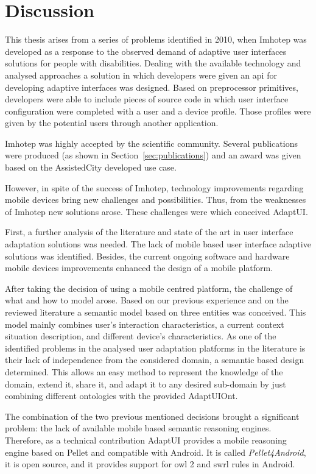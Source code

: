 \section{Discussion}
\label{sec:discussion}

This thesis arises from a series of problems identified in 2010, when Imhotep
was developed as a response to the observed demand of adaptive user interfaces 
solutions for people with disabilities. Dealing with the available technology
and analysed approaches a solution in which developers were given an \ac{api}
for developing adaptive interfaces was designed. Based on preprocessor primitives,
developers were able to include pieces of source code in which user interface
configuration were completed with a user and a device profile. Those profiles
were given by the potential users through another application.

Imhotep was highly accepted by the scientific community. Several publications
were produced (as shown in Section~\ref{sec:publications}) and an award was 
given based on the AssistedCity developed use case.

However, in spite of the success of Imhotep, technology improvements regarding
mobile devices bring new challenges and possibilities. Thus, from the weaknesses
of Imhotep new solutions arose. These challenges were which conceived AdaptUI.

First, a further analysis of the literature and state of the art in user 
interface adaptation solutions was needed. The lack of mobile based user 
interface adaptive solutions was identified. Besides, the current ongoing 
software and hardware mobile devices improvements enhanced the design of a 
mobile platform.

After taking the decision of using a mobile centred platform, the challenge of
what and how to model arose. Based on our previous experience and on the reviewed
literature a semantic model based on three entities was conceived. This model
mainly combines user's interaction characteristics, a current context situation
description, and different device's characteristics. As one of the identified
problems in the analysed user adaptation platforms in the literature is their
lack of independence from the considered domain, a semantic based design determined.
This allows an easy method to represent the knowledge of the domain, extend it,
share it, and adapt it to any desired sub-domain by just combining different 
ontologies with the provided AdaptUIOnt.

The combination of the two previous mentioned decisions brought a significant
problem: the lack of available mobile based semantic reasoning engines. Therefore,
as a technical contribution AdaptUI provides a mobile reasoning engine based on
Pellet and compatible with Android. It is called \textit{Pellet4Android}, it is
open source, and it provides support for \ac{owl} 2 and \ac{swrl} rules in Android.

